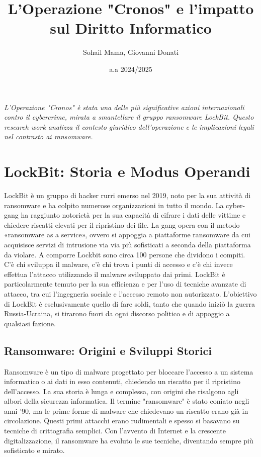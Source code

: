 \documentclass[a4paper,12pt]{article}
\title{L'Operazione "Cronos" e l'impatto sul Diritto Informatico}
\author{Sohail Mama, Giovanni Donati}
\date{a.a 2024/2025}
\begin{document}
\maketitle

\vfill
\begin{center}
\textit{L'Operazione "Cronos" è stata una delle più significative azioni internazionali contro il cybercrime, mirata a smantellare il gruppo ransomware LockBit. Questo research work analizza il contesto giuridico dell'operazione e le implicazioni legali nel contrasto ai ransomware.}
\end{center}
\vfill

\newpage
\tableofcontents
\newpage

\section{LockBit: Storia e Modus Operandi}

LockBit è un gruppo di hacker rurri emerso nel 2019, noto per la sua attività di ransomware e ha colpito numerose organizzazioni in tutto il mondo. La cyber-gang ha raggiunto notorietà per la sua capacità di cifrare i dati delle vittime e chiedere riscatti elevati per il ripristino dei file. La gang opera con il metodo «ransomware as a service», ovvero si appoggia a piattaforme ransomware da cui acquisisce servizi di intrusione via via più sofisticati a seconda della piattaforma da violare. A comporre Lockbit sono circa 100 persone che dividono i compiti. C'è chi sviluppa il malware, c'è chi trova i punti di accesso e c'è chi invece effettua l'attacco utilizzando il malware sviluppato dai primi. LockBit è particolarmente temuto per la sua efficienza e per l'uso di tecniche avanzate di attacco, tra cui l'ingegneria sociale e l'accesso remoto non autorizzato. L'obiettivo di LockBit è esclusivamente quello di fare soldi, tanto che quando iniziò la guerra Russia-Ucraina, si tirarono fuori da ogni discorso politico e di appoggio a qualsiasi fazione.


\subsection{Ransomware: Origini e Sviluppi Storici}
Ransomware è un tipo di malware progettato per bloccare l'accesso a un sistema informatico o ai dati in esso contenuti, chiedendo un riscatto per il ripristino dell'accesso. La sua storia è lunga e complessa, con origini che risalgono agli albori della sicurezza informatica.
Il termine "ransomware" è stato coniato negli anni '90, ma le prime forme di malware che chiedevano un riscatto erano già in circolazione. Questi primi attacchi erano rudimentali e spesso si basavano su tecniche di crittografia semplici. Con l'avvento di Internet e la crescente digitalizzazione, il ransomware ha evoluto le sue tecniche, diventando sempre più sofisticato e mirato.
\end{document}
